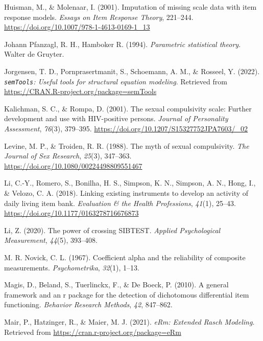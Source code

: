 \documentclass[
  man,floatsintext]{apa6}
\newlength{\cslhangindent}
\newlength{\cslentryspacingunit} %
\newenvironment{CSLReferences}[2] %
 {%
  \setlength{\parindent}{0pt}
  \ifodd #1
  \let\oldpar\par
  \def\par{\hangindent=\cslhangindent\oldpar}
  \fi
  \setlength{\parskip}{#2\cslentryspacingunit}
 }%
 {}
\begin{document}
\begin{CSLReferences}{1}{0}
\leavevmode{}%
Huisman, M., \& Molenaar, I. (2001). Imputation of missing scale data with item response models. \emph{Essays on Item Response Theory}, 221--244. \url{https://doi.org/10.1007/978-1-4613-0169-1_13}

\leavevmode{}%
Johann Pfanzagl, R. H., Hamboker R. (1994). \emph{Parametric statistical theory}. Walter de Gruyter.

\leavevmode{}%
Jorgensen, T. D., Pornprasertmanit, S., Schoemann, A. M., \& Rosseel, Y. (2022). \emph{\texttt{semTools}: {U}seful tools for structural equation modeling}. Retrieved from \url{https://CRAN.R-project.org/package=semTools}

\leavevmode{}%
Kalichman, S. C., \& Rompa, D. (2001). The sexual compulsivity scale: Further development and use with HIV-positive persons. \emph{Journal of Personality Assessment}, \emph{76}(3), 379--395. \url{https://doi.org/10.1207/S15327752JPA7603/_02}

\leavevmode{}%
Levine, M. P., \& Troiden, R. R. (1988). The myth of sexual compulsivity. \emph{The Journal of Sex Research}, \emph{25}(3), 347--363. \url{https://doi.org/10.1080/00224498809551467}

\leavevmode{}%
Li, C.-Y., Romero, S., Bonilha, H. S., Simpson, K. N., Simpson, A. N., Hong, I., \& Velozo, C. A. (2018). Linking existing instruments to develop an activity of daily living item bank. \emph{Evaluation \& the Health Professions}, \emph{41}(1), 25--43. \url{https://doi.org/10.1177/0163278716676873}

\leavevmode{}%
Li, Z. (2020). The power of crossing SIBTEST. \emph{Applied Psychological Measurement}, \emph{44}(5), 393--408.

\leavevmode{}%
M. R. Novick, C. L. (1967). Coefficient alpha and the reliability of composite measurements. \emph{Psychometrika}, \emph{32}(1), 1--13.

\leavevmode{}%
Magis, D., Beland, S., Tuerlinckx, F., \& De Boeck, P. (2010). A general framework and an r package for the detection of dichotomous differential item functioning. \emph{Behavior Research Methods}, \emph{42}, 847--862.

\leavevmode{}%
Mair, P., Hatzinger, R., \& Maier, M. J. (2021). \emph{{eRm: Extended Rasch Modeling}}. Retrieved from \url{https://cran.r-project.org/package=eRm}


\end{CSLReferences}
\end{document}
